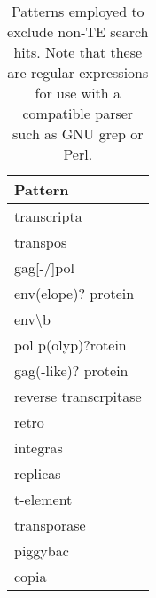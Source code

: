 \begin{table}[h]
\caption[Word patterns to exclude non-TE search hits]{{Patterns employed to
exclude non-TE search hits. Note that these are regular expressions for use
with a compatible parser such as GNU grep or Perl.\label{tab:patterns}}}
\centering
\begin{tabular}{@{}l@{}}
\toprule
Pattern               \\ \midrule
transcripta           \\
transpos              \\
gag{[}-/{]}pol        \\
env(elope)? protein   \\
env\textbackslash{}b  \\
pol p(olyp)?rotein    \\
gag(-like)? protein   \\
reverse transcrpitase \\
retro                 \\
integras              \\
replicas              \\
t-element             \\
transporase           \\
piggybac              \\
copia                 \\ \bottomrule
\end{tabular}
\end{table}

